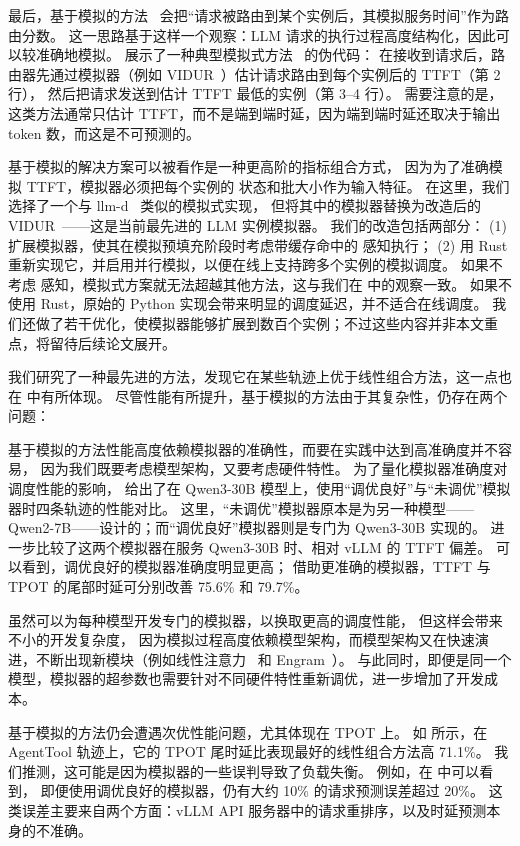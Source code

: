 最后，基于模拟的方法~\cite{305212, llm-d, DBLP:journals/corr/abs-2507-17769, DBLP:journals/corr/abs-2504-08784}
会把“请求被路由到某个实例后，其模拟服务时间”作为路由分数。
这一思路基于这样一个观察：LLM 请求的执行过程高度结构化，因此可以较准确地模拟。
{} 展示了一种典型模拟式方法~\cite{llm-d} 的伪代码：
在接收到请求后，路由器先通过模拟器（例如 VIDUR~\cite{DBLP:conf/mlsys/AgrawalKMPKGRT24}）估计请求路由到每个实例后的 TTFT（第 2 行），
然后把请求发送到估计 TTFT 最低的实例（第 3--4 行）。
需要注意的是，这类方法通常只估计 TTFT，而不是端到端时延，因为端到端时延还取决于输出 token 数，而这是不可预测的。

基于模拟的解决方案可以被看作是一种更高阶的指标组合方式，
因为为了准确模拟 TTFT，模拟器必须把每个实例的 {\kvcache} 状态和批大小作为输入特征。
在这里，我们选择了一个与 llm-d~\cite{llm-d} 类似的模拟式实现，
但将其中的模拟器替换为改造后的 VIDUR~\cite{DBLP:conf/mlsys/AgrawalKMPKGRT24}——这是当前最先进的 LLM 实例模拟器。
我们的改造包括两部分：
(1) 扩展模拟器，使其在模拟预填充阶段时考虑带缓存命中的 {\kvcache} 感知执行；
(2) 用 Rust 重新实现它，并启用并行模拟，以便在线上支持跨多个实例的模拟调度。
如果不考虑 {\kvcache} 感知，模拟式方案就无法超越其他方法，这与我们在 \textsection{\ref{sec:kvcache-aware}} 中的观察一致。
如果不使用 Rust，原始的 Python 实现会带来明显的调度延迟，并不适合在线调度。
我们还做了若干优化，使模拟器能够扩展到数百个实例；不过这些内容并非本文重点，将留待后续论文展开。

我们研究了一种最先进的方法，发现它在某些轨迹上优于线性组合方法，这一点也在 {} 中有所体现。
尽管性能有所提升，基于模拟的方法由于其复杂性，仍存在两个问题：

基于模拟的方法性能高度依赖模拟器的准确性，而要在实践中达到高准确度并不容易，
因为我们既要考虑模型架构，又要考虑硬件特性。
为了量化模拟器准确度对调度性能的影响，
{} 给出了在 Qwen3-30B 模型上，使用“调优良好”与“未调优”模拟器时四条轨迹的性能对比。
这里，“未调优”模拟器原本是为另一种模型——Qwen2-7B——设计的；而“调优良好”模拟器则是专门为 Qwen3-30B 实现的。
{} 进一步比较了这两个模拟器在服务 Qwen3-30B 时、相对 vLLM 的 TTFT 偏差。
可以看到，调优良好的模拟器准确度明显更高；
借助更准确的模拟器，TTFT 与 TPOT 的尾部时延可分别改善 75.6\% 和 79.7\%。

虽然可以为每种模型开发专门的模拟器，以换取更高的调度性能，
但这样会带来不小的开发复杂度，
因为模拟过程高度依赖模型架构，而模型架构又在快速演进，不断出现新模块（例如线性注意力~\cite{qwen3-next} 和 Engram~\cite{cheng2026conditionalmemoryscalablelookup}）。
与此同时，即便是同一个模型，模拟器的超参数也需要针对不同硬件特性重新调优，进一步增加了开发成本。

基于模拟的方法仍会遭遇次优性能问题，尤其体现在 TPOT 上。
如 {} 所示，在 AgentTool 轨迹上，它的 TPOT 尾时延比表现最好的线性组合方法高 71.1\%。
我们推测，这可能是因为模拟器的一些误判导致了负载失衡。
例如，在 {} 中可以看到，
即便使用调优良好的模拟器，仍有大约 10\% 的请求预测误差超过 20\%。
这类误差主要来自两个方面：vLLM API 服务器中的请求重排序，以及时延预测本身的不准确。

